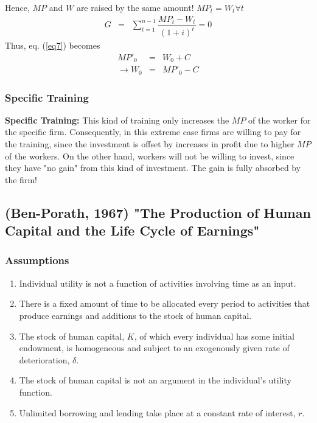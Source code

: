 \documentclass[12pt,a4paper]{article}
\begin{document}
  Hence, $MP$ and $W$ are raised by the same amount! $MP_t = W_t
  \forall t$ 
  \begin{eqnarray}
    G&=& \sum_{t=1}^{n-1} \dfrac{MP_t - W_t}{(1+i)^{t}}=0
  \end{eqnarray}
  Thus, eq. (\ref{eq7}) becomes 
  \begin{eqnarray}
    MP'_0 &=& W_0 +C \\
    \rightarrow W_0 &=& MP'_0 -C
  \end{eqnarray}
  \subsubsection{Specific Training} %
  \label{sub:Specific_Training}
  \textbf{Specific Training:} This kind of training only increases the
  $MP$ of the worker for the specific firm.
  Consequently, in this extreme case firms are willing to pay for the
  training, since the investment is offset by increases in profit due
  to higher $MP$ of the workers. On the other hand, workers will not
  be willing to invest, since they have "no gain" from this kind of
  investment. The gain is fully absorbed by the firm!

  \subsection{(Ben-Porath, 1967) "The Production of Human Capital and the Life Cycle of Earnings"} %
  \subsubsection{Assumptions}
    \begin{enumerate}
      \item Individual utility is not a function of activities involving time as an input.
      \item There is a fixed amount of time to be allocated every period to activities that produce earnings and additions to the stock of human capital.
      \item The stock of human capital, $K$, of which every individual has some initial endowment, is homogeneous and subject to an exogenously given rate of deterioration, $\delta$.
      \item The stock of human capital is not an argument in the individual's utility function.
      \item Unlimited borrowing and lending take place at a constant rate of interest, $r$.
    \end{enumerate}
\end{document}

